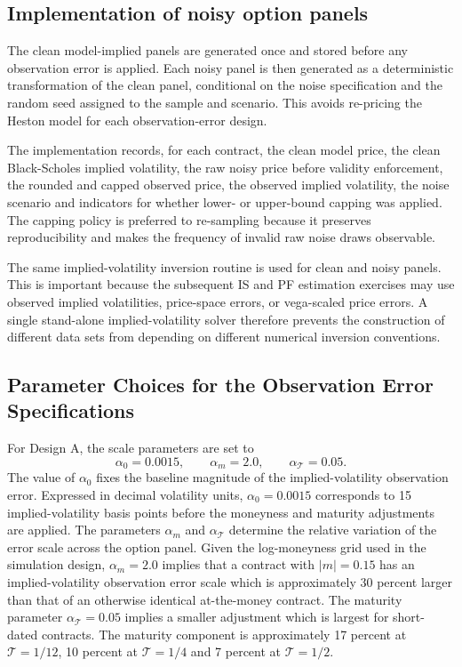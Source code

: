 \documentclass[11pt,a4paper,notitlepage]{article}
\numberwithin{equation}{section}
\begin{document}
\subsection{Implementation of noisy option panels}
The clean model-implied panels are generated once and stored before any observation error is applied. Each
noisy panel is then generated as a deterministic transformation of the clean panel, conditional on the
noise specification and the random seed assigned to the sample and scenario. This avoids re-pricing the Heston
model for each observation-error design.

The implementation records, for each contract, the clean model price, the clean Black-Scholes implied volatility,
the raw noisy price before validity enforcement, the rounded and capped observed price, the observed implied
volatility, the noise scenario and indicators for whether lower- or upper-bound capping was applied. The capping
policy is preferred to re-sampling because it preserves reproducibility and makes the frequency of invalid raw
noise draws observable.

The same implied-volatility inversion routine is used for clean and noisy panels. This is important because
the subsequent IS and PF estimation exercises may use observed implied volatilities, price-space errors, or
vega-scaled price errors. A single stand-alone implied-volatility solver therefore prevents the construction of
different data sets from depending on different numerical inversion conventions.

\subsection{Parameter Choices for the Observation Error Specifications}
For Design A, the scale parameters are set to
\[
\alpha_0=0.0015,\qquad \alpha_m=2.0,\qquad \alpha_{\mathcal T}=0.05.
\]
The value of $\alpha_0$ fixes the baseline magnitude of the implied-volatility observation error. Expressed in decimal volatility units, $\alpha_0=0.0015$ corresponds to 15 implied-volatility basis points before the moneyness and maturity adjustments are applied. The parameters $\alpha_m$ and $\alpha_{\mathcal T}$ determine the relative variation of the error scale across the option panel. Given the log-moneyness grid used in the simulation design, $\alpha_m=2.0$ implies that a contract with $|m|=0.15$ has an implied-volatility observation error scale which is approximately 30 percent larger than that of an otherwise identical at-the-money contract. The maturity parameter $\alpha_{\mathcal T}=0.05$ implies a smaller adjustment which is largest for short-dated contracts. The maturity component is approximately 17 percent at $\mathcal T=1/12$, 10 percent at $\mathcal T=1/4$ and 7 percent at $\mathcal T=1/2$.
\end{document}
